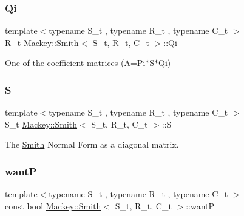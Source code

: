 \mbox{\label{classMackey_1_1Smith_a8446d6e35feabbdc233e2a15efde4930}} 
\subsubsection{\texorpdfstring{Qi}{Qi}}
{\footnotesize\ttfamily template$<$typename S\+\_\+t , typename R\+\_\+t , typename C\+\_\+t $>$ \\
R\+\_\+t \hyperlink{classMackey_1_1Smith}{Mackey\+::\+Smith}$<$ S\+\_\+t, R\+\_\+t, C\+\_\+t $>$\+::Qi}



One of the coefficient matrices (A=Pi$\ast$\+S$\ast$\+Qi) 

\mbox{\label{classMackey_1_1Smith_a2c4e977af966b2956354dce7e40dd5e1}} 
\subsubsection{\texorpdfstring{S}{S}}
{\footnotesize\ttfamily template$<$typename S\+\_\+t , typename R\+\_\+t , typename C\+\_\+t $>$ \\
S\+\_\+t \hyperlink{classMackey_1_1Smith}{Mackey\+::\+Smith}$<$ S\+\_\+t, R\+\_\+t, C\+\_\+t $>$\+::S\hspace{0.3cm}{\ttfamily [protected]}}



The \hyperlink{classMackey_1_1Smith}{Smith} Normal Form as a diagonal matrix. 

\mbox{\label{classMackey_1_1Smith_a7033b338fda868e33f50950d2444ae75}} 
\subsubsection{\texorpdfstring{wantP}{wantP}}
{\footnotesize\ttfamily template$<$typename S\+\_\+t , typename R\+\_\+t , typename C\+\_\+t $>$ \\
const bool \hyperlink{classMackey_1_1Smith}{Mackey\+::\+Smith}$<$ S\+\_\+t, R\+\_\+t, C\+\_\+t $>$\+::wantP\hspace{0.3cm}{\ttfamily [protected]}}




